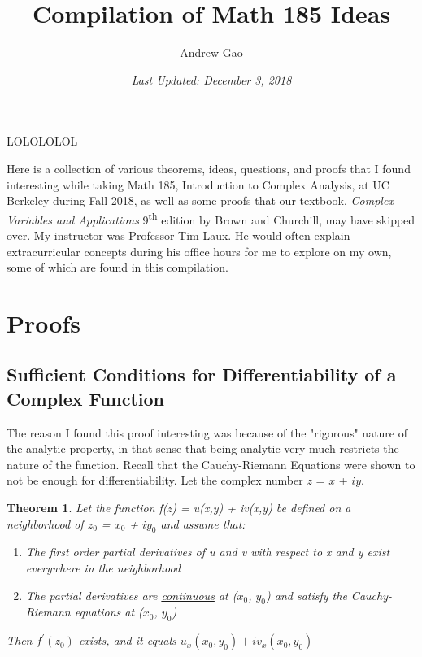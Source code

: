 \documentclass[12pt]{article}
\title{\huge{Compilation of Math 185 Ideas\vspace{1em}}}
\author{\large Andrew Gao \vspace{-10pt}}
\affil{\normalsize{University of California, Berkeley \vspace{10pt}}}
\date{\textsl{\normalsize{Last Updated: December 3, 2018\vspace{1ex}}}}
\newtheorem{theorem}{Theorem}
\theoremstyle{definition}
\theoremstyle{remark}
\begin{document}
\maketitle

LOLOLOLOL

Here is a collection of various theorems, ideas, questions, and proofs that I found interesting while taking Math 185, Introduction to Complex Analysis, at UC Berkeley during Fall 2018, as well as some proofs that our textbook, \textit{Complex Variables and Applications} 9\textsuperscript{th} edition by Brown and Churchill, may have skipped over. My instructor was Professor Tim Laux. He would often explain extracurricular concepts during his office hours for me to explore on my own, some of which are found in this compilation.\vspace{1em}

\tableofcontents
\pagebreak

\section{Proofs}
\subsection*{Sufficient Conditions for Differentiability of a Complex Function}
The reason I found this proof interesting was because of the "rigorous" nature of the analytic property, in that sense that being analytic very much restricts the nature of the function. Recall that the Cauchy-Riemann Equations were shown to not be enough for differentiability. Let the complex number $z$ = $x$ + $iy$.


\begin{theorem}
Let the function f(z) = u(x,y) + iv(x,y) be defined on a neighborhood of $z_0$ = $x_0$ + $iy_0$ and assume that:
\begin{enumerate}[label=\Alph*)]
    \item The first order partial derivatives of u and v with respect to x and y exist everywhere in the neighborhood
    \item The partial derivatives are \underline{continuous} at ($x_0$, $y_0$) and satisfy the Cauchy-Riemann equations at ($x_0$, $y_0$)
\end{enumerate}
Then $f^\prime(z_0)$ exists, and it equals $u_x(x_0, y_0) + iv_x(x_0,y_0)$
\end{theorem}
\end{document}
